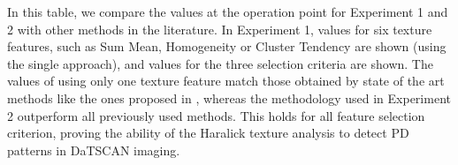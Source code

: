 In this table, we compare the values at the operation point for Experiment 1 and 2 with other methods in the literature. In Experiment 1, values for six texture features, such as Sum Mean, Homogeneity or Cluster Tendency are shown (using the single approach), and values for the three selection criteria are shown. The values of using only one texture feature match those obtained by state of the art methods like the ones proposed in \cite{Segovia2012,Rojas2012}, whereas the methodology used in Experiment 2 outperform all previously used methods. This holds for all feature selection criterion, proving the ability of the Haralick texture analysis to detect \ac{PD} patterns in DaTSCAN imaging. 

